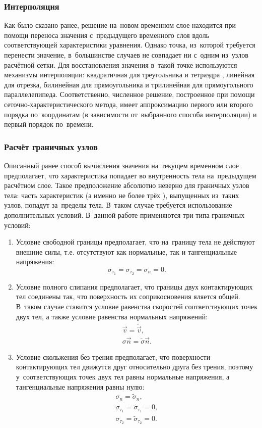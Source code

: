 \documentclass[thesis.tex]{subfiles}
\begin{document}
\subsubsection{Интерполяция}
Как было сказано ранее, решение на~новом временном слое находится при помощи переноса значения с~предыдущего временного
слоя вдоль соответствующей характеристики уравнения. Однако точка, из~которой требуется перенести значение, в~большинстве
случаев не совпадает ни с~одним из~узлов расчётной сетки. Для восстановления значения в~такой точке используются
механизмы интерполяции: квадратичная для треугольника и тетраэдра \cite{петров2011библиотека}, линейная для отрезка,
билинейная для прямоугольника и трилинейная для прямоугольного параллелепипеда. Соответственно, численное решение,
построенное при помощи се\-точ\-но-ха\-рак\-те\-рис\-ти\-чес\-ко\-го метода, имеет аппроксимацию первого или второго
порядка по~координатам (в зависимости от~выбранного способа интерполяции) и первый порядок по~времени.

\subsubsection{Расчёт граничных узлов}
Описанный ранее способ вычисления значения на~текущем временном слое предполагает, что характеристика попадает во
внутренность тела на~предыдущем расчётном слое. Такое предположение абсолютно неверно для граничных узлов тела: часть
характеристик (а именно не более трёх \cite{челноков2005диссертация}), выпущенных из~таких узлов, попадут за~пределы
тела. В~таком случае требуется использование дополнительных условий. В~данной работе применяются три типа граничных
условий:
\begin{enumerate}
    \item Условие свободной границы предполагает, что на~границу тела не действуют внешние силы, т.е. отсутствуют как
    нормальные, так и тангенциальные напряжения:
    \[
        \sigma_{\tau_1}=\sigma_{\tau_2}=\sigma_n=0.
    \]
    \item Условие полного слипания предполагает, что границы двух контактирующих тел соединены так, что поверхность
    их соприкосновения яляется общей. В~таком случае ставится условие равенства скоростей соответствующих точек двух тел,
    а также условие равенства нормальных напряжений:
    \begin{align}
        \vec v=\tilde{\vec v}, \nonumber \\
        \sigma\vec n=\tilde \sigma \vec n. \nonumber
    \end{align}
    \item Условие скольжения без трения предполагает, что поверхности контактирующих тел движутся друг относительно
    друга без трения, поэтому у~соответствующих точек двух тел равны нормальные напряжения, а тангенциальные напряжения
    равны нулю:
    \begin{align}
        \sigma_n=\tilde{\sigma}_n, \nonumber \\
        \sigma_{\tau_1}=\tilde{\sigma}_{\tau_1}=0, \nonumber  \\
        \sigma_{\tau_2}=\tilde{\sigma}_{\tau_2}=0. \nonumber
    \end{align}
\end{enumerate}
\end{document}
